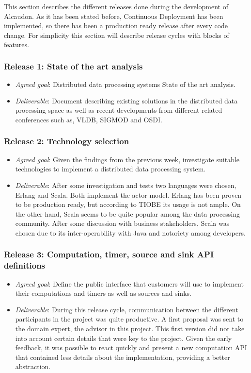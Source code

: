 This section describes the different releases done during the development of
Alcaudon. As it has been stated before, Continuous Deployment has been
implemented, so there has been a production ready release after every code
change. For simplicity this section will describe release cycles with blocks of
features.

\subsubsection{Release 1: State of the art analysis}
\begin{itemize}
\item \textit{Agreed goal}: Distributed data processing systems State of the art analysis.
  \item \textit{Deliverable}: Document describing existing solutions in the
    distributed data processing space as well as recent developments from
    different related conferences such as, VLDB, SIGMOD and OSDI.
\end{itemize}

\subsubsection{Release 2: Technology selection}
\begin{itemize}
\item \textit{Agreed goal}: Given the findings from the previous week,
  investigate suitable technologies to implement a distributed data processing
  system.
\item \textit{Deliverable}: After some investigation and tests two languages
  were chosen, Erlang and Scala. Both implement the actor model. Erlang has been
  proven to be production ready, but according to TIOBE\cite{tiobe} its usage is
  not ample. On the other hand, Scala seems to be quite popular among the data
  processing community. After some discussion with business stakeholders, Scala
  was chosen due to its inter-operability with Java and notoriety among
  developers.
\end{itemize}

\subsubsection{Release 3: Computation, timer, source and sink API definitions}
\begin{itemize}
\item \textit{Agreed goal}: Define the public interface that customers will use
  to implement their computations and timers as well as sources and sinks.
\item \textit{Deliverable}: During this release cycle, communication between the
  different participants in the project was quite productive. A first proposal
  was sent to the domain expert, the advisor in this project. This first version
  did not take into account certain details that were key to the project. Given
  the early feedback, it was possible to react quickly and present a new
  computation API that contained less details about the implementation,
  providing a better abstraction.
\end{itemize}

